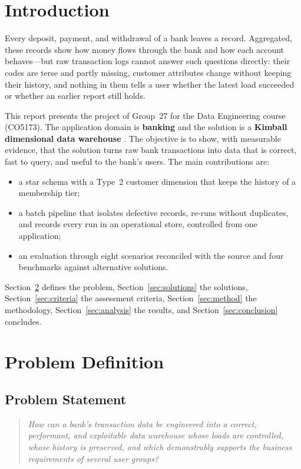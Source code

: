 \documentclass[peerreview]{IEEEtran}
\begin{document}
\section{Introduction}
\label{sec:intro}

Every deposit, payment, and withdrawal of a bank leaves a record. Aggregated, these records
show how money flows through the bank and how each account behaves---but raw transaction logs
cannot answer such questions directly: their codes are terse and partly missing, customer
attributes change without keeping their history, and nothing in them tells a user whether the
latest load succeeded or whether an earlier report still holds.

This report presents the project of Group~27 for the Data Engineering course (CO5173). The
application domain is \textbf{banking} and the solution is a \textbf{Kimball dimensional data
warehouse} \cite{kimball2013}. The objective is to show, with measurable evidence, that the
solution turns raw bank transactions into data that is correct, fast to query, and useful to
the bank's users. The main contributions are:
\begin{itemize}
  \item a star schema with a Type~2 customer dimension that keeps the history of a
        membership tier;
  \item a batch pipeline that isolates defective records, re-runs without duplicates, and
        records every run in an operational store, controlled from one application;
  \item an evaluation through eight scenarios reconciled with the source and four
        benchmarks against alternative solutions.
\end{itemize}
Section~\ref{sec:problem} defines the problem, Section~\ref{sec:solutions} the solutions,
Section~\ref{sec:criteria} the assessment criteria, Section~\ref{sec:method} the methodology,
Section~\ref{sec:analysis} the results, and Section~\ref{sec:conclusion} concludes.


\section{Problem Definition}
\label{sec:problem}

\subsection{Problem Statement}
\begin{quote}
\emph{How can a bank's transaction data be engineered into a correct, performant, and
exploitable data warehouse whose loads are controlled, whose history is preserved, and which
demonstrably supports the business requirements of several user groups?}
\end{quote}
\end{document}

